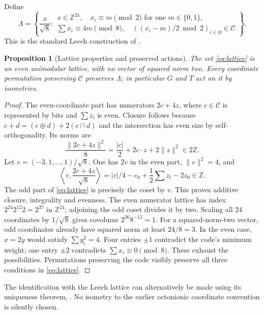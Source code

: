 \documentclass[11pt,reqno]{amsart}
\newtheorem{proposition}[theorem]{Proposition}
\theoremstyle{definition}\newtheorem{definition}[theorem]{Definition}
\theoremstyle{remark}\newtheorem{remark}[theorem]{Remark}
\newcommand{\Z}{\mathbb Z}\newcommand{\Q}{\mathbb Q}\newcommand{\R}{\mathbb R}\newcommand{\C}{\mathbb C}\newcommand{\F}{\mathbb F}
\begin{document}
Define
\begin{equation}\label{eq:lattice}
\Lambda=\left\{\frac{x}{\sqrt8}:\begin{array}{l}
x\in\Z^{24},\quad x_i\equiv m\pmod2\text{ for one }m\in\{0,1\},\\
\sum x_i\equiv4m\pmod8,\quad
((x_i-m)/2\bmod2)_{i\in\Omega}\in\mathcal C
\end{array}\right\}.
\end{equation}
This is the standard Leech construction of \cite[Theorem 1.4, p.~4]{Brouwer}.

\begin{proposition}[Lattice properties and preserved actions]\label{prop:lattice}
The set \eqref{eq:lattice} is an even unimodular lattice, with no vector of squared norm two. Every coordinate permutation preserving $\mathcal C$ preserves $\Lambda$; in particular $G$ and $T$ act on it by isometries.
\end{proposition}
\begin{proof}
The even-coordinate part has numerators $2c+4z$, where $c\in\mathcal C$ is represented by bits and $\sum z_i$ is even. Closure follows because $c+d=(c\mathbin\oplus d)+2(c\cap d)$ and the intersection has even size by self-orthogonality. Its norms are
\[
\frac{\|2c+4z\|^2}{8}=\frac{|c|}{2}+2c\cdot z+2\|z\|^2\in2\Z.
\]
Let $v=(-3,1,\ldots,1)/\sqrt8$. One has $2v$ in the even part, $\|v\|^2=4$, and
\[
\left\langle v,\frac{2c+4z}{\sqrt8}\right\rangle
=|c|/4-c_0+\frac12\sum z_i-2z_0\in\Z.
\]
The odd part of \eqref{eq:lattice} is precisely the coset by $v$. This proves additive closure, integrality and evenness. The even numerator lattice has index $2^{24}2^{12}2=2^{37}$ in $\Z^{24}$; adjoining the odd coset divides it by two. Scaling all 24 coordinates by $1/\sqrt8$ gives covolume $2^{36}8^{-12}=1$.
For a squared-norm-two vector, odd coordinates already have squared norm at least $24/8=3$. In the even case, $x=2y$ would satisfy $\sum y_i^2=4$. Four entries $\pm1$ contradict the code's minimum weight; one entry $\pm2$ contradicts $\sum x_i\equiv0\pmod8$. These exhaust the possibilities. Permutations preserving the code visibly preserve all three conditions in \eqref{eq:lattice}.
\end{proof}
The identification with the Leech lattice can alternatively be made using its uniqueness theorem, \cite[Theorem 1.1]{Brouwer}. No isometry to the earlier octonionic coordinate convention is silently chosen.
\end{document}
